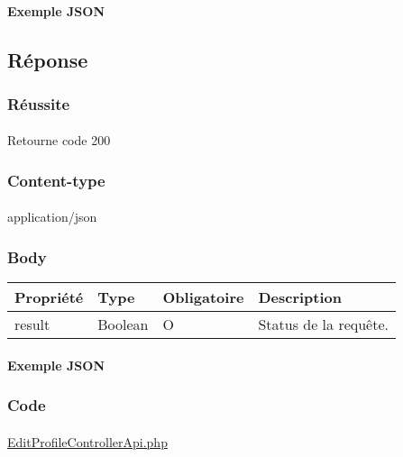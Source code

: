 		\paragraph{Exemple JSON}
			\paragraph{}
			

\subsection{Réponse}
	\subsubsection{Réussite}
		\paragraph{}
			Retourne code 200
			
	\subsubsection{Content-type}
		\paragraph{}
			application/json
	
	\subsubsection{Body}
		\begin{center}
			\begin{tabularx}{\textwidth}{| T{0.2122\textwidth} | S{0.22\textwidth} | S{0.15\textwidth} | S{0.3\textwidth} |}
				\hline
				Propriété & Type & Obligatoire & Description \\
				\hline
				result & Boolean & O & Status de la requête. \\
				\hline
			\end{tabularx}
		\end{center}
		
		\vspace{\baselineskip}
		\paragraph{Exemple JSON}
			\paragraph{}
			
			
			
	\subsubsection{Code}
		\paragraph{}
			\href{https://github.com/victorsmits/Aquabike/blob/master/backend/src/Controller/API/EditProfileControllerApi.php}{EditProfileControllerApi.php}